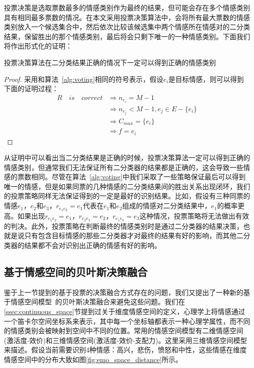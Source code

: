 投票决策是选取票数最多的情感类别作为最终的结果，但可能会存在多个情感类别具有相同最多票数的情况。在本文采用投票决策算法中，会将所有最大票数的情感类别放入一个候选集合中，然后依次比较该候选集中两个情感所在情感对的二分类结果，保留胜出的那个情感类别，最后将会只剩下唯一的一种情感类别。下面我们将作出形式化的证明：

\begin{proposition}
    投票决策算法在二分类结果正确的情况下一定可以得到正确的情感类别
\end{proposition}
\begin{proof}
    采用和算法~\ref{alg:voting}相同的符号表示，假设$e_i$是目标情感，则可以得到下面的证明过程：
    \[
        \begin{aligned}
            R \quad is \quad correct &\Rightarrow n_{e_i} = M - 1 \\
            &\Rightarrow n_{e_j} < M - 1, e_j \in E - \{e_i\} \\
            &\Rightarrow C_{max} = \{e_i\} \\
            &\Rightarrow f = e_i
        \end{aligned}
    \]
\end{proof}

从证明中可以看出当二分类结果是正确的时候，投票决策算法一定可以得到正确的情感类别，但通常我们无法保证所有二分类器的结果都是正确的，这会导致一些情感的票数相同。尽管在算法~\ref{alg:voting}中我们采取了一些策略保证最后可以得到唯一的情感，但是如果同票的几种情感的二分类结果间的胜出关系出现闭环，我们的投票策略同样无法保证得到的一定是最好的识别结果。比如，假设有三种同票的情感$e_1$，$e_2$和$e_3$，$r_{e_1e_2}=e_1$代表在$e_1$和$e_2$组成的情感对二分类结果中，$e_1$的概率更高。如果出现$r_{e_1e_2}=e_1$，$r_{e_2e_3}=e_2$，$r_{e_1e_3}=e_3$这种情况，投票策略将无法做出有效的判决。此外，投票策略在判断最终的情感类别时是通过二分类器的结果决策，也就是说只有包含目标情感的那些二分类器才对最终的结果有好的影响，而其他二分类器的结果都不会对识别出正确的情感有好的影响。

\subsection{基于情感空间的贝叶斯决策融合}
\label{emo_space_decision_fusion}
鉴于上一节提到的基于投票的决策融合方式存在的问题，我们又提出了一种新的基于情感空间模型~\cite{Cowie2002Emotion}的贝叶斯决策融合来避免这些问题。我们在\ref{ssec:continuous_space}节提到过关于维度情感空间的定义，心理学上将情感通过一个笛卡尔空间坐标系来表示，其中每一个坐标轴都表示一种心理学属性，而不同的情感类别会被映射到空间中不同的位置。常用的情感空间模型有二维情感空间(激活度-效价)和三维情感空间(激活度-效价-支配力)。这里采用三维情感空间模型来描述。假设当前需要识别4种情感：高兴，悲伤，愤怒和中性，这些情感在维度情感空间中的分布大致如图\ref{fig:emo_space_distance}所示。

